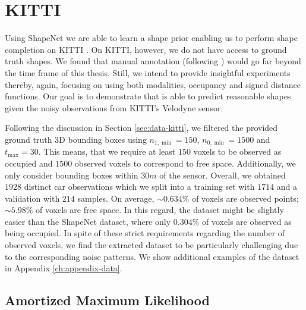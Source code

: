 \section{KITTI}

Using ShapeNet \cite{ChangFunkhouserGuibasSavarese:2015} we are able to learn
a shape prior enabling us to perform shape completion on KITTI
\cite{GeigerLenzUrtasun:2012,GeigerLenzStillerUrtasun:2013}.
On KITTI, however, we do not have access to ground truth shapes.
We found that manual annotation (\eg following \cite{MenzeGeiger:2015}) 
would go far beyond the time frame of this thesis. Still,
we intend to provide insightful experiments thereby, again, focusing on
\AML using both modalities, \ie occupancy and signed distance functions.
Our goal is to demonstrate that \AML is able to predict reasonable
shapes given the noisy observations from KITTI's Velodyne sensor.

Following the discussion in Section \ref{sec:data-kitti}, we filtered
the provided ground truth 3D bounding boxes using $n_{1,\min} = 150$,
$n_{0,\min} = 1500$ and $t_{\max} = 30$. This means, that we require at least
$150$ voxels to be observed as occupied and $1500$ observed voxels
to correspond to free space. Additionally, we only consider bounding boxes
within $30m$ of the sensor. Overall, we obtained $1928$ distinct car observations
which we split into a training set with $1714$ and a validation with
$214$ samples.
On average, $\sim 0.634\%$ of voxels are observed points; $\sim 5.98\%$
of voxels are free space. In this regard, the dataset might be slightly
easier than the \hard ShapeNet dataset, where only $0.304\%$ of voxels are
observed as being occupied. In spite of these strict requirements regarding
the number of observed voxels, we find the extracted dataset to be particularly
challenging due to the corresponding noise patterns. We show additional examples
of the dataset in Appendix \ref{ch:appendix-data}.

\subsection{Amortized Maximum Likelihood}



